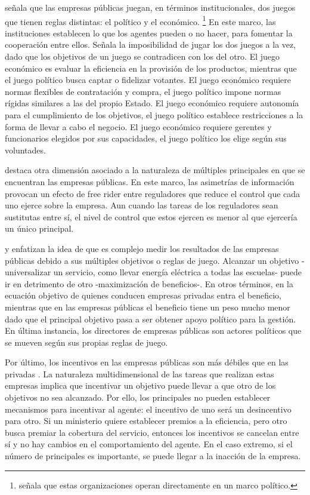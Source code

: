 \documentclass[
  12pt,
  spanish,
]{book}
\begin{document}
\citet{Miltnisky2001} señala que las empresas públicas juegan, en
términos institucionales, dos juegos que tienen reglas distintas: el
político y el económico. \footnote{\citet{Dixit1997} señala que estas
  organizaciones operan directamente en un marco político.} En este
marco, las instituciones establecen lo que los agentes pueden o no
hacer, para fomentar la cooperación entre ellos. Señala la imposibilidad
de jugar los dos juegos a la vez, dado que los objetivos de un juego se
contradicen con los del otro. El juego económico es evaluar la
eficiencia en la provisión de los productos, mientras que el juego
político busca captar o fidelizar votantes. El juego económico requiere
normas flexibles de contratación y compra, el juego político impone
normas rígidas similares a las del propio Estado. El juego económico
requiere autonomía para el cumplimiento de los objetivos, el juego
político establece restricciones a la forma de llevar a cabo el negocio.
El juego económico requiere gerentes y funcionarios elegidos por sus
capacidades, el juego político los elige según sus voluntades.

\citet{Martimort1996} destaca otra dimensión asociado a la naturaleza de
múltiples principales en que se encuentran las empresas públicas. En
este marco, las asimetrías de información provocan un efecto de free
rider entre reguladores que reduce el control que cada uno ejerce sobre
la empresa. Aun cuando las tareas de los reguladores sean sustitutas
entre sí, el nivel de control que estos ejercen es menor al que
ejercería un único principal.

\citet{Miltnisky2001} y \citet{Jones1982} enfatizan la idea de que es
complejo medir los resultados de las empresas públicas debido a sus
múltiples objetivos o reglas de juego. Alcanzar un objetivo
-universalizar un servicio, como llevar energía eléctrica a todas las
escuelas- puede ir en detrimento de otro -maximización de beneficios-.
En otros términos, en la ecuación objetivo de quienes conducen empresas
privadas entra el beneficio, mientras que en las empresas públicas el
beneficio tiene un peso mucho menor dado que el principal objetivo pasa
a ser obtener apoyo político para la gestión. En última instancia, los
directores de empresas públicas son actores políticos que se mueven
según sus propias reglas de juego.

Por último, los incentivos en las empresas públicas son más débiles que
en las privadas \citep{Dixit1997}. La naturaleza multidimensional de las
tareas que realizan estas empresas implica que incentivar un objetivo
puede llevar a que otro de los objetivos no sea alcanzado. Por ello, los
principales no pueden establecer mecanismos para incentivar al agente:
el incentivo de uno será un desincentivo para otro. Si un ministerio
quiere establecer premios a la eficiencia, pero otro busca premiar la
cobertura del servicio, entonces los incentivos se cancelan entre sí y
no hay cambios en el comportamiento del agente. En el caso extremo, si
el número de principales es importante, se puede llegar a la inacción de
la empresa.
\end{document}
